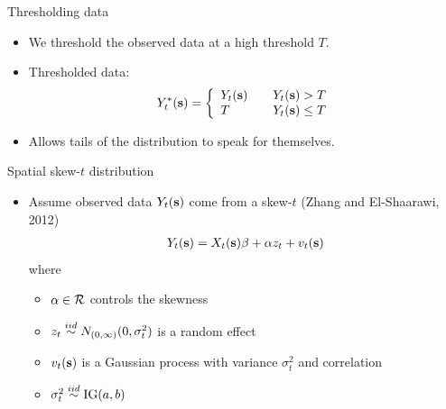 \documentclass{beamer}
\begin{document}
\begin{frame}{Thresholding data}
  \begin{itemize} \setlength{\itemsep}{0.5em}
    \item We threshold the observed data at a high threshold $T$.
    \item Thresholded data:
    \begin{align*}
      Y_t^*(\mbox{\bf s}) = \left\{ \begin{array}{ll}
          Y_t(\mbox{\bf s}) \quad & Y_t(\mbox{\bf s}) > T\\
          T \quad & Y_t(\mbox{\bf s}) \le T
      \end{array}\right.
    \end{align*}
    \item Allows tails of the distribution to speak for themselves.
  \end{itemize}
\end{frame}

\begin{frame}{Spatial skew-$t$ distribution}
  \begin{itemize} \setlength{\itemsep}{0.5em}
    \item Assume observed data $Y_t(\mbox{\bf s})$ come from a skew-$t$ (Zhang and El-Shaarawi, 2012)
    \begin{align*}
      Y_t(\mbox{\bf s}) = X_t(\mbox{\bf s})\beta + \alpha z_t + v_t(\mbox{\bf s})
    \end{align*}
    where
    \begin{itemize} \setlength{\itemsep}{0.25em}
      \item $\alpha \in {\cal R}$ controls the skewness
      \item $z_t \stackrel{iid}{\sim} N_{(0, \infty)}(0, \sigma^2_t)$ is a random effect
      \item $v_t(\mbox{\bf s})$ is a Gaussian process with variance $\sigma^2_t$ and \Matern correlation
      \item $\sigma_t^2 \stackrel{iid}{\sim} \text{IG}(a, b)$
    \end{itemize}
  \end{itemize}
\end{frame}
\end{document}
